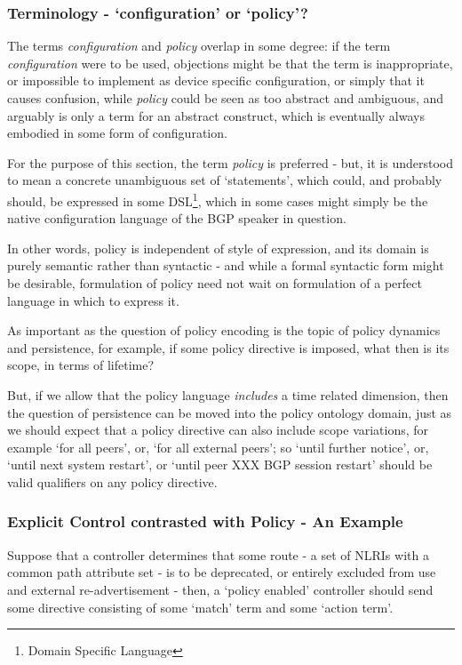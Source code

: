\subsubsection{Terminology - `configuration' or `policy'?}
The terms \textit{configuration} and \textit{policy} overlap in some degree: if the term \textit{configuration} were to be used, objections might be that the term is inappropriate, or impossible to implement as device specific configuration, or simply that it causes confusion, while \textit{policy} could be seen as too abstract and ambiguous, and arguably is only a term for an abstract construct, which is eventually always embodied in some form of configuration.

For the purpose of this section, the term \textit{policy} is preferred -  but, it is understood to mean a concrete unambiguous set of `statements', which could, and probably should, be expressed in some DSL\footnote{Domain Specific Language}, which in some cases might simply be the native configuration language of the BGP speaker in question.

In other words, policy is independent of style of expression, and its domain is purely semantic rather than syntactic - and while a formal syntactic form might be desirable, formulation of policy need not wait on formulation of a perfect language in which to express it.

\medskip

As important as the question of policy encoding is the topic of policy dynamics and persistence, for example, if some policy directive is imposed, what then is its scope, in terms of lifetime?

But, if we allow that the policy language \textit{includes} a time related dimension, then the question of persistence can be moved into the policy ontology domain, just as we should expect that a policy directive can also include scope variations, for example `for all peers', or, `for all external peers'; so `until further notice', or, `until next system restart', or `until peer XXX BGP session restart' should be valid qualifiers on any policy directive.

\subsubsection{Explicit Control contrasted with Policy - An Example}
Suppose that a controller determines that some route -  a set of NLRIs with a common path attribute set - is to be deprecated, or entirely excluded from use and external re-advertisement - then, a `policy enabled' controller should send some directive consisting of some `match' term and some `action term'.

